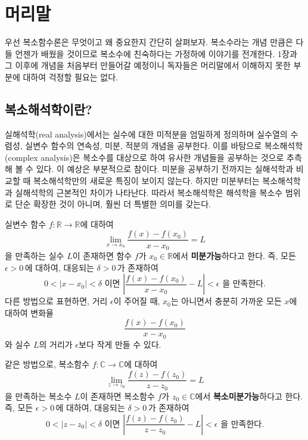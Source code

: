 \chapter*[머리말]{머리말}




우선 복소함수론은 무엇이고 왜 중요한지 간단히 살펴보자.
복소수라는 개념 만큼은 다들 언젠가 배웠을 것이므로 
복소수에 친숙하다는 가정하에 이야기를 전개한다.
1장과 그 이후에 개념을 처음부터 만들어갈 예정이니
독자들은 머리말에서 이해하지 못한 부분에 대하여 걱정할 필요는 없다.

\section*{복소해석학이란?}
실해석학(real analysis)에서는 실수에 대한 미적분을 엄밀하게 정의하며
실수열의 수렴성, 실변수 함수의 연속성, 미분, 적분의 개념을 공부한다.
이를 바탕으로 복소해석학(complex analysis)은
복소수를 대상으로 하여 유사한 개념들을 공부하는 것으로 추측해 볼 수 있다.
이 예상은 부분적으로 참이다.
미분을 공부하기 전까지는 실해석학과 비교할 때 복소해석학만의
새로운 특징이 보이지 않는다.
하지만 미분부터는 복소해석학과 실해석학의 근본적인 차이가 나타난다.
따라서 복소해석학은 해석학을 복소수 범위로 단순 확장한 것이 아니며, 훨씬 더 특별한 의미를 갖는다.


실변수 함수 $f:\mathbb R \to \mathbb R$에 대하여
$$
\lim_{x\to x_0} \frac{f(x)-f(x_0)}{x-x_0} = L
$$
을 만족하는 실수 $L$이 존재하면 
함수 $f$가 $x_0\in \mathbb R$에서 {\bf 미분가능}하다고 한다.
즉, 모든 $\epsilon>0\,$에 대하여,  대응되는 $\delta>0\,$가 존재하여
$$
0<|x-x_0|<\delta \text{ 이면 }
\left| \frac{f(x)-f(x_0)}{x-x_0} - L\right| < \epsilon \text{ 을 만족한다.}
$$
다른 방법으로 표현하면, 
거리 $\epsilon$이 주어질 때,
$x_0$는 아니면서 충분히 가까운 모든 $x$에 대하여 변화율
$$
 \frac{f(x)-f(x_0)}{x-x_0}
$$
와 실수 $L$의 거리가 $\epsilon$보다 작게 만들 수 있다.

같은 방법으로, 복소함수 $f:\mathbb C \to \mathbb C$에 대하여
$$
\lim_{z\to z_0} \frac{f(z)-f(z_0)}{z-z_0} = L
$$
을 만족하는 복소수 $L$이 존재하면 
복소함수 $f$가 
$z_0\in \mathbb C$에서 {\bf 복소미분가능}하다고 한다.
즉, 모든 $\epsilon>0\,$에 대하여, 대응되는 $\delta>0\,$가  존재하여
$$
0<|z-z_0|<\delta \text{ 이면 }
\left| \frac{f(z)-f(z_0)}{z-z_0} - L\right| < \epsilon \text{ 을 만족한다.}
$$

